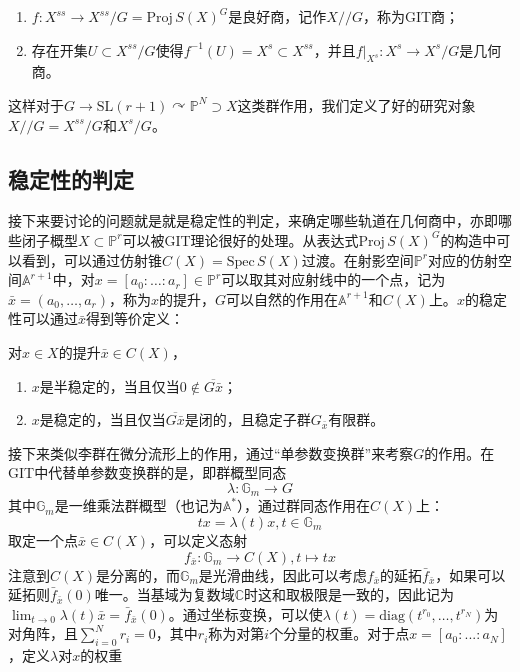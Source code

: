 \begin{theorem}
	\begin{enumerate}
		\item 	$ f :X^{ss} \to  X^{ss}/G=\mathrm{Proj} \,S(X)^G $是良好商，记作$ X//G $，称为GIT商；
		\item 存在开集$ U\subset X^{ss}/G $使得$ f^{-1}(U)=X^s\subset X^{ss} $，并且$ f|_{X^s} :X^{s}\to  X^{s}/G  $是几何商。
	\end{enumerate}
\end{theorem}

这样对于$ G\to \mathrm{SL}(r+1)\curvearrowright\mathbb{P}^N\supset X $这类群作用，我们定义了好的研究对象$ X//G=X^{ss}/G $和$ X^s/G $。
\subsection{稳定性的判定}
接下来要讨论的问题就是就是稳定性的判定，来确定哪些轨道在几何商中，亦即哪些闭子概型$ X\subset \mathbb{P}^r $可以被GIT理论很好的处理。从表达式$ \mathrm{Proj} \,S(X)^G $的构造中可以看到，可以通过仿射锥$ C(X)=\mathrm{Spec}\,S(X) $过渡。在射影空间$ \mathbb{P}^r $对应的仿射空间$ \mathbb{A}^{r+1} $中，对$ x=[a_0:\ldots:a_r]\in\mathbb{P}^r  $可以取其对应射线中的一个点，记为$ \bar{x}=(a_0,\ldots,a_r)$，称为$ x $的提升，$ G $可以自然的作用在$ \mathbb{A}^{r+1} $和$ C(X) $上。$ x $的稳定性可以通过$ \bar{x} $得到等价定义：
\begin{lemma}
	对$ x \in  X  $的提升$ \bar{x}\in C(X) $，
	\begin{enumerate}
		\item $ x $是半稳定的，当且仅当$ 0\notin \overline{G\bar{x}} $；
		\item $ x $是稳定的，当且仅当$ \overline{G\bar{x}} $是闭的，且稳定子群$ G_{\bar{x}} $有限群。
	\end{enumerate}
\end{lemma}
接下来类似李群在微分流形上的作用，通过“单参数变换群”来考察$ G $的作用。在GIT中代替单参数变换群的是，即群概型同态
$$ \lambda: \mathbb{G}_m\to G $$
其中$ \mathbb{G}_m $是一维乘法群概型（也记为$ \mathbb{A}^* $），通过群同态作用在$ C(X) $上：
$$ tx=\lambda(t)x,t\in \mathbb{G}_m $$
取定一个点$ \bar{x}\in C(X) $，可以定义态射
$$ f_{\bar{x}}:\mathbb{G}_m\to C(X),t\mapsto tx $$
注意到$ C(X) $是分离的，而$ \mathbb{G}_m $是光滑曲线，因此可以考虑$ f_{\bar{x}} $的延拓$ \bar{f}_{\bar{x} } $，如果可以延拓则$ \bar{f}_{\bar{x} }(0) $唯一。当基域为复数域$ \mathbb{C} $时这和取极限是一致的，因此记为$ \lim _{t\to 0}\lambda(t)\bar{x}=\bar{f}_{\bar{x} }(0) $。通过坐标变换，可以使$ \lambda(t)=\mathrm{diag}(t^{r_0},\ldots,t^{r_N})$为对角阵，且$\sum_{i=0}^{N}r_i=0 $，其中$ r_i $称为对第$ i $个分量的权重。对于点$ x=[a_0:...:a_N] $，定义$ \lambda $对$ x $的权重
